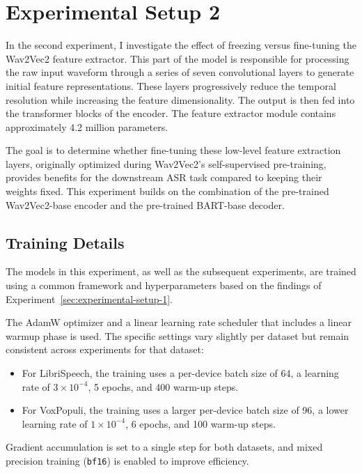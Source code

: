 \section{Experimental Setup 2}\label{exp2actually}

In the second experiment, I investigate the effect of freezing versus fine-tuning the Wav2Vec2 feature extractor. This part of the model is responsible for processing the raw input waveform through a series of seven convolutional layers to generate initial feature representations. These layers progressively reduce the temporal resolution while increasing the feature dimensionality. The output is then fed into the transformer blocks of the encoder. The feature extractor module contains approximately 4.2 million parameters.

The goal is to determine whether fine-tuning these low-level feature extraction layers, originally optimized during Wav2Vec2's self-supervised pre-training, provides benefits for the downstream ASR task compared to keeping their weights fixed. This experiment builds on the combination of the pre-trained Wav2Vec2-base encoder and the pre-trained BART-base decoder.

\subsection{Training Details}\label{sec:common_training_details}
The models in this experiment, as well as the subsequent experiments, are trained using a common framework and hyperparameters based on the findings of Experiment~\ref{sec:experimental-setup-1}.

The AdamW optimizer \cite{loshchilov2019decoupledweightdecayregularization} and a linear learning rate scheduler that includes a linear warmup phase is used. The specific settings vary slightly per dataset but remain consistent across experiments for that dataset:

\begin{itemize}
    \item For LibriSpeech, the training uses a per-device batch size of 64, a learning rate of \(3 \times 10^{-4}\), 5 epochs, and 400 warm-up steps.
    \item For VoxPopuli, the training uses a larger per-device batch size of 96, a lower learning rate of \(1 \times 10^{-4}\), 6 epochs, and 100 warm-up steps.
\end{itemize}

Gradient accumulation is set to a single step for both datasets, and mixed precision training (\texttt{bf16}) \cite{kalamkar2019study} is enabled to improve efficiency.

